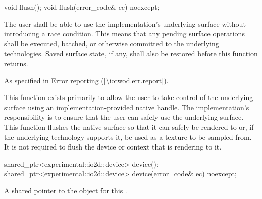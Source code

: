 \begin{itemdecl}
void flush();
void flush(error_code& ec) noexcept;
\end{itemdecl}
\begin{itemdescr}
\pnum
\effects
The user shall be able to use the implementation's underlying surface without introducing a race condition. This means that any pending surface operations shall be executed, batched, or otherwise committed to the underlying technologies. Saved surface state, if any, shall also be restored before this function returns.

\pnum
\throws
As specified in Error reporting (\ref{\iotwod.err.report}).

\pnum
\remarks
This function exists primarily to allow the user to take control of the underlying surface using an implementation-provided native handle. The implementation's responsibility is to ensure that the user can safely use the underlying surface.
\enternote
This function flushes the native surface so that it can safely be rendered to or, if the underlying technology supports it, be used as a texture to be sampled from. It is not required to flush the device or context that is rendering to it.
\exitnote

\pnum
\errors

\end{itemdescr}

\begin{itemdecl}
shared_ptr<experimental::io2d::device> device();
shared_ptr<experimental::io2d::device> device(error_code& ec) noexcept;
\end{itemdecl}
\begin{itemdescr}
\pnum
\returns
A shared pointer to the  object for this .	
\end{itemdescr}

